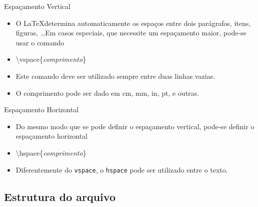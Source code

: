 \begin{frame}{Espaçamento Vertical}
    \begin{itemize}
    \item O \LaTeX determina automaticamente os espaços entre dois parágrafos, itens, figuras, \dots Em casos especiais, que necessite um espaçamento maior, pode-se usar o comando
    \item[] \alert{\textbackslash vspace\{\textit{comprimento}\}}
    
    \vspace{.5cm}

    \item Este comando deve ser utilizado sempre entre duas linhas vazias.
    \item O comprimento pode ser dado em cm, mm, in, pt, e outras.
    \end{itemize}
\end{frame}

\begin{frame}[fragile]{Espaçamento Horizontal}
    \begin{itemize}
    \item Do mesmo modo que se pode definir o espaçamento vertical, pode-se definir o espaçamento horizontal
    \item[] \alert{\textbackslash hspace\{\textit{comprimento}\}}

    \vspace{.5cm}

    \item Diferentemente do \verb|vspace|, o \verb|hspace| pode ser utilizado entre o texto.
    \end{itemize}
\end{frame}

\subsection{Estrutura do arquivo}

